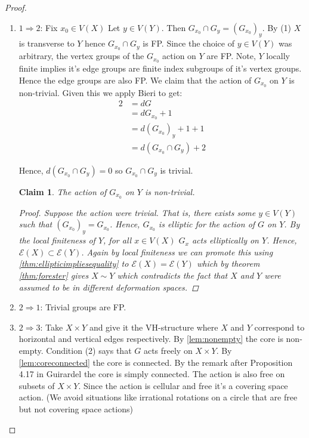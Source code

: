 \documentclass{article}
\theoremstyle{mystyle}
\newtheorem*{claim*}{Claim}
\theoremstyle{remark}
\begin{document}
\begin{proof}
\begin{enumerate}
    \item $1\Rightarrow 2$: Fix $x_0 \in V(X)$ Let $y\in V(Y)$. Then $G_{x_0} \cap G_y = (G_{x_0})_y$. By (1) $X$ is transverse to $Y$ hence $G_{x_0}\cap G_y$ is FP. Since the choice of $y\in V(Y)$ was arbitrary, the vertex groups of the $G_{x_0}$ action on $Y$ are FP. Note, $Y$ locally finite implies it's edge groups are finite index subgroups of it's vertex groups. Hence the edge groups are also FP. We claim that the action of $G_{x_0}$ on $Y$ is non-trivial. Given this we apply Bieri to get:
    \begin{align*}
        2 &= dG\\
          &= dG_{x_0}+1\\
          &= d( G_{x_0} )_y+1+1\\
          &= d(G_{x_0}\cap G_y)+2
    \end{align*}
    
    Hence, $d(G_{x_0}\cap G_y)=0$ so $G_{x_0}\cap G_y$ is trivial.
    
    \begin{claim*}
    The action of $G_{x_0}$ on $Y$ is non-trivial.
    \begin{proof}
        Suppose the action were trivial. That is, there exists some $y\in V(Y)$ such that $(G_{x_0})_y=G_{x_0}$. Hence, $G_{x_0}$ is elliptic for the action of $G$ on $Y$. By the local finiteness of $Y$, for all $x\in V(X)$ $G_x$ acts elliptically on $Y$. Hence, $\mathcal{E}(X)\subset \mathcal{E}(Y)$. Again by local finiteness we can promote this using \ref{thm:ellipticimpliesequality} to $\mathcal{E}(X) = \mathcal{E}(Y)$ which by theorem \ref{thm:forester} gives $X \sim Y$ which contradicts the fact that $X$ and $Y$ were assumed to be in different deformation spaces.
    \end{proof}
    \end{claim*}
    \item $2\Rightarrow 1$: Trivial groups are FP.
    \item $2\Rightarrow 3$: Take $X \times Y$ and give it the VH-structure where $X$ and $Y$ correspond to horizontal and vertical edges respectively. By \ref{lem:nonempty} the core is non-empty. Condition (2) says that $G$ acts freely on $X\times Y$. By \ref{lem:coreconnected} the core is connected. By the remark after Proposition 4.17 in Guirardel the core is simply connected. The action is also free on subsets of $X \times Y$. Since the action is cellular and free it's a covering space action. (We avoid situations like irrational rotations on a circle that are free but not covering space actions) 
    

\end{enumerate}
\end{proof}
\end{document}
